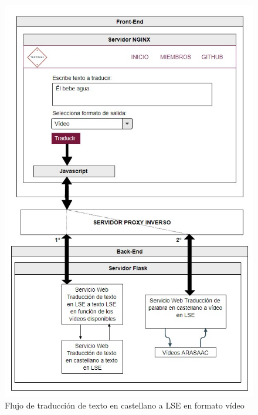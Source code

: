 \begin{figure}[]
	\centering
	\includegraphics[width=1\textwidth]{Imagenes/Fuentes/Text2LSE/esquemaTradVideo.jpg}
	\caption{ Flujo de traducción de texto en castellano a LSE en formato vídeo }
	\label {fig: esquemaTradVideo}
\end{figure}

